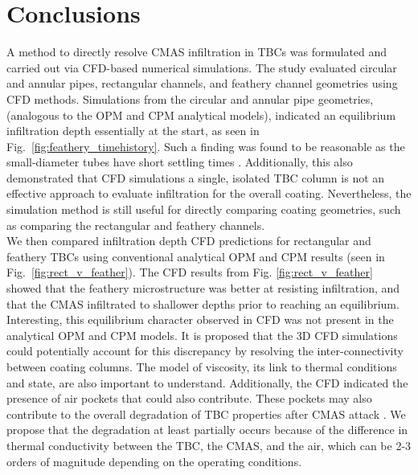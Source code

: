 \documentclass[%
 aip,
 amsmath,amssymb,
 reprint,%
]{revtex4-1}
\begin{document}
\section{Conclusions}
A method to directly resolve CMAS infiltration in TBCs was formulated and carried out via CFD-based numerical simulations. 
The study evaluated circular and annular pipes, rectangular channels, and feathery channel geometries using CFD methods. 
Simulations from the circular and annular pipe geometries, (analogous to the OPM and CPM analytical models\cite{Naraparaju2019}), indicated an equilibrium infiltration depth essentially at the start,  as seen in Fig.~\ref{fig:feathery_timehistory}. 
Such a finding was found to be reasonable as the small-diameter tubes have short settling times \cite{Weislogel}. 
Additionally, this also demonstrated that CFD simulations a single, isolated TBC column is not an effective approach to evaluate infiltration for the overall coating.
Nevertheless, the simulation method is still useful for directly comparing coating geometries, such as comparing the rectangular and feathery channels.\\

We then compared infiltration depth CFD predictions for rectangular and feathery TBCs using conventional analytical OPM and CPM results (seen in Fig.~\ref{fig:rect_v_feather}). 
The CFD results from Fig. \ref{fig:rect_v_feather} showed that the feathery microstructure was better at resisting infiltration, and that the CMAS infiltrated to shallower depths prior to reaching an equilibrium. 
Interesting, this equilibrium character observed in CFD was not present in the analytical OPM and CPM models.
It is proposed that the 3D CFD simulations could potentially account for this discrepancy by resolving the inter-connectivity between coating columns. The model of viscosity, its link to thermal conditions and state, are also important to understand. Additionally, the CFD indicated the presence of air pockets that could also contribute. These pockets may also contribute to the overall degradation of TBC properties after CMAS attack \cite{Naraparaju2014,Naraparaju2017, Naraparaju2019}. 
We propose that the degradation at least partially occurs because of the difference in thermal conductivity between the TBC, the CMAS, and the air, which can be 2-3 orders of magnitude depending on the operating conditions. 
\end{document}
